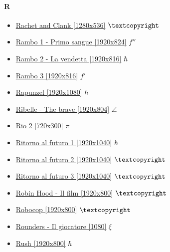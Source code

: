 	\paragraph{R} \hypertarget{FIR}{}
		\begin{itemize}
			\item \href{https://mega.nz/#!aXgzFQhB!x1yZKpPD93-k8M8TW6bYWf_yKvWiqHhRFemLKcKzaHA} {Rachet and Clank [1280x536]}  $\textcopyright$ \\ 
			\item \href{https://mega.nz/#!jfwSBIbC!PNHaOP2yvBqJO9waRv55e-lyQDlT2esd5yU5_UEaR4o} {Rambo 1 - Primo sangue [1920x824]}  $f''$ \\ 
			\item \href{https://mega.nz/#!aqRBBRLK!yrh-QOHPursYELxHLrjwwFI9aO_INToFUqt01uov_Og} {Rambo 2 - La vendetta [1920x816]}  $\hbar$ \\ 
			\item \href{https://mega.nz/#!WmRVWBgT!xGgxQEuVFETb8N2_ZdSbINDyLr3jojz0xGDg1wnW-kk} {Rambo 3 [1920x816]}  $f'$ \\
			\item \href{https://mega.nz/#!q6gjjSTB!da_tza5UFuW07HEY1V2bBP9euAF090ZtQvhv5YT0lhk} {Rapunzel [1920x1080]}  $\hbar$ \\ 
			\item \href{https://mega.nz/#!83YxkJxC!HVbf8oXYP-fVwgiKma16WWaoxuq5rMI433l327Zcj-c} {Ribelle - The brave [1920x804]}  $\angle$ \\ 
			\item \href{https://mega.nz/#!oVp00TTL!iSHb7XWm8EOB0SJfCg44jaJxKGkzNl0wdICEL8V3U7A} {Rio 2 [720x300]}  $\pi$ \\ 
			\item \href{https://mega.nz/#!Dv5zWbpR!x9XJJTuHo5GtIeq-c6LRdDpPCLx2cf1rXVeb8xqkpzw} {Ritorno al futuro 1 [1920x1040]}  $\hbar$ \\ 
			\item \href{https://mega.nz/#!De4jyJZK!c9RH2kz-6xvina9b_y_w5RwNTNYwv5Xoik3hv8v1oNE} {Ritorno al futuro 2 [1920x1040]}  $\textcopyright$ \\ 
			\item \href{https://mega.nz/#!aSIxTBaD!62ehvjcLXLnlgx-PT76kEGElW8_k2E8eQhf6rzzfjE8} {Ritorno al futuro 3 [1920x1040]}  $\textcopyright$ \\ 
			\item \href{https://mega.nz/#!WOAR1TAB!CBa4_RbeTP1w2d1hMMuyXUFh7AHDA3D2zgglhPozDwU} {Robin Hood - Il film [1920x800]}  $\textcopyright$ \\ 
			\item \href{https://mega.nz/#!CPxzjTID!f8bihSFJ7YgsmeSkLOcF-7mpHvJCbBwjg3z3AAWcb1I} {Robocop [1920x800]}  $\textcopyright$ \\ 
			\item \href{https://mega.nz/#!KtZRASjK!xM-26aLV_0xof5Bas-xDimDUrYUJ9eeYSr842gCk4TE} {Rounders - Il giocatore [1080]}  $\xi$ \\ 
			\item \href{https://mega.nz/#!PmBikCJb!8YTWqg-oIau9XYx3E7rvzhpVXK6SmMNmYIXyNcfNIXY} {Rush [1920x800]}  $\hbar$ \\ 
		
		
	\end{itemize}	
		
